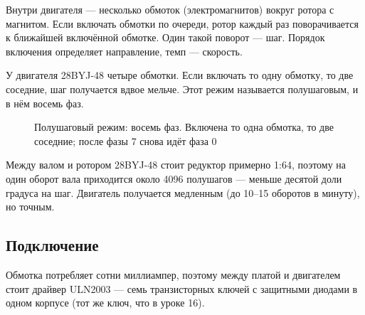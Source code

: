 Внутри двигателя --- несколько обмоток (электромагнитов) вокруг ротора с магнитом. Если включать обмотки
по очереди, ротор каждый раз поворачивается к ближайшей включённой обмотке. Один такой поворот ---
шаг. Порядок включения определяет направление, темп --- скорость.

У двигателя 28BYJ-48 четыре обмотки. Если включать то одну обмотку, то две соседние, шаг получается
вдвое мельче. Этот режим называется полушаговым, и в нём восемь фаз.

\begin{figure}[H]
\centering
{}
\caption{Полушаговый режим: восемь фаз. Включена то одна обмотка, то две соседние; после фазы 7 снова идёт фаза 0}
\end{figure}

Между валом и ротором 28BYJ-48 стоит редуктор примерно 1:64, поэтому на один оборот вала приходится
около 4096 полушагов --- меньше десятой доли градуса на шаг. Двигатель получается медленным (до
10--15 оборотов в минуту), но точным.

\subsection{Подключение}

Обмотка потребляет сотни миллиампер, поэтому между платой и двигателем стоит драйвер ULN2003 --- семь
транзисторных ключей с защитными диодами в одном корпусе (тот же ключ, что в уроке 16).

